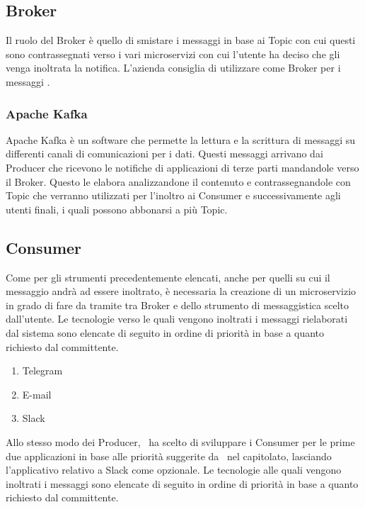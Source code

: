 		
	\subsection{Broker}
	
		Il ruolo del Broker è quello di smistare i messaggi in base ai Topic con cui questi sono contrassegnati verso i vari microservizi con cui l'utente ha deciso che gli venga inoltrata la notifica.
		L'azienda consiglia di utilizzare come Broker per i messaggi .
	
		\subsubsection{Apache Kafka}
		Apache Kafka è un software  che permette la lettura e la scrittura di messaggi su differenti canali di comunicazioni per i dati.
		Questi messaggi arrivano dai Producer che ricevono le notifiche di applicazioni di terze parti mandandole verso il Broker. Questo le elabora analizzandone il contenuto e contrassegnandole con Topic che verranno utilizzati per l'inoltro ai Consumer e successivamente agli utenti finali, i quali possono abbonarsi a più Topic.
	
	\subsection{Consumer}
		Come per gli strumenti precedentemente elencati, anche per quelli su cui il messaggio andrà ad essere inoltrato, è necessaria la creazione di un microservizio in grado di fare da tramite tra Broker e  dello strumento di messaggistica scelto dall'utente.
		Le tecnologie verso le quali vengono inoltrati i messaggi rielaborati dal sistema sono elencate di seguito in ordine di priorità in base a quanto richiesto dal committente.
		\begin{enumerate}
			\item Telegram
			\item E-mail
			\item Slack
		\end{enumerate}
		Allo stesso modo dei Producer, \gruppo\ ha scelto di sviluppare i Consumer per le prime due applicazioni in base alle priorità suggerite da \II\ nel capitolato, lasciando l'applicativo relativo a Slack come opzionale.
		Le tecnologie alle quali vengono inoltrati i messaggi sono elencate di seguito in ordine di priorità in base a quanto richiesto dal committente.
			
